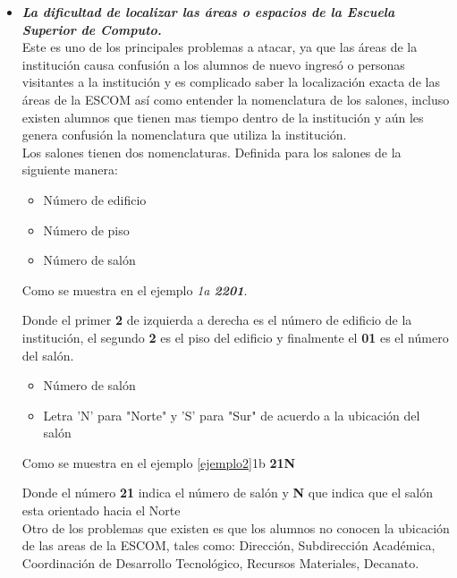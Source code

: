 	\begin{itemize}
		\item \textbf{\textit{La dificultad de localizar las áreas o espacios de la Escuela Superior de Computo.}}\\
		
		Este es uno de los principales problemas a atacar, ya que las áreas de la institución causa confusión a los alumnos de nuevo ingresó o personas visitantes a la institución y es complicado saber la localización exacta de las áreas de la ESCOM así como entender la nomenclatura de los salones, incluso existen alumnos que tienen mas tiempo dentro de la institución y aún les genera confusión la nomenclatura que utiliza la institución.\\ 
		
		Los salones tienen dos nomenclaturas. Definida para los salones de la siguiente manera:
		\begin{itemize}
			\item Número de edificio
			\item Número de piso
			\item Número de salón
		\end{itemize}
		
		Como se muestra en el ejemplo \textit{1a \textbf{2201}}.
		
		Donde el primer \textbf{2} de izquierda a derecha es el número de edificio de la institución, el segundo \textbf{2} es el piso del edificio y finalmente el \textbf{01} es el número del salón.\\
		
		\begin{itemize}
			\item Número de salón
			\item Letra 'N' para "Norte"  y  'S' para "Sur" de acuerdo a  la ubicación del salón
		\end{itemize}
		
		Como se muestra en el ejemplo \ref{ejemplo2}{1b} \textbf{21N} \label{ejemplo2} 
		
		Donde el número \textbf{21} indica el número de salón y \textbf{N} que indica que el salón esta orientado hacia el Norte\\
		
		Otro de los problemas que existen es que los alumnos no conocen la ubicación de las areas de la ESCOM, tales como: Dirección, Subdirección Académica, Coordinación de Desarrollo Tecnológico, Recursos Materiales, Decanato.\\ 
		

\end{itemize}
